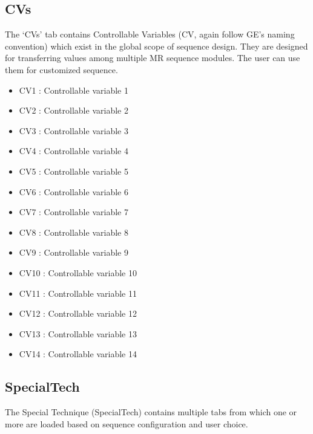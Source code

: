 \documentclass{book}%
\begin{document}
\subsection{CVs}
The `CVs' tab contains Controllable Variables (CV, again follow GE's naming convention) which exist in the global scope of sequence design. They are designed for transferring values among multiple MR sequence modules. The user can use them for customized sequence.
	\begin{itemize}
		\item CV1 : Controllable variable 1
		\item CV2 : Controllable variable 2
		\item CV3 : Controllable variable 3
		\item CV4 : Controllable variable 4
		\item CV5 : Controllable variable 5
		\item CV6 : Controllable variable 6
		\item CV7 : Controllable variable 7
		\item CV8 : Controllable variable 8
		\item CV9 : Controllable variable 9
		\item CV10 : Controllable variable 10
		\item CV11 : Controllable variable 11
		\item CV12 : Controllable variable 12
		\item CV13 : Controllable variable 13
		\item CV14 : Controllable variable 14
	\end{itemize}

\subsection{SpecialTech}

The Special Technique (SpecialTech) contains multiple tabs from which one or more are loaded based on sequence configuration and user choice.
\end{document}
